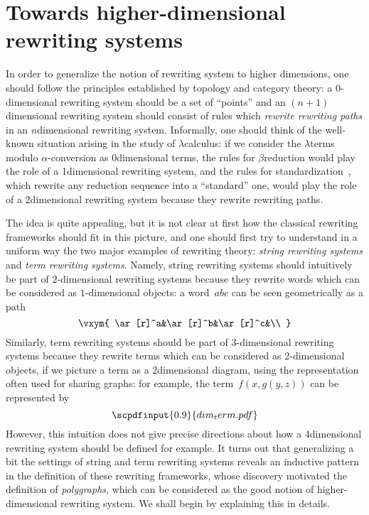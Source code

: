 \documentclass{LMCS}
\newcommand{\strid}[1]{\scpdfinput{0.9}{#1.pdf}}
\begin{document}
\section{Towards higher-dimensional rewriting systems}
\label{sec:hdrs}
In order to generalize the notion of rewriting system to higher dimensions, one
should follow the principles established by topology and category theory: a
$0$-dimensional rewriting system should be a set of ``points'' and an
$(n+1)$\nbd{}dimensional rewriting system should consist of rules which
\emph{rewrite rewriting paths} in an $n$\nbd{}dimensional rewriting
system. Informally, one should think of the well-known situation arising in the
study of $\lambda$\nbd{}calculus: if we consider the $\lambda$\nbd{}terms modulo
$\alpha$-conversion as $0$\nbd{}dimensional terms, the rules for
$\beta$\nbd{}reduction would play the role of a 1\nbd{}dimensional rewriting
system, and the rules for standardization~\cite{mellies:ast}, which rewrite any
reduction sequence into a ``standard'' one, would play the role of a 2\nbd{}dimensional
rewriting system because they rewrite rewriting paths.

The idea is quite appealing, but it is not clear at first how the classical
rewriting frameworks should fit in this picture, and one should first try to
understand in a uniform way the two major examples of rewriting theory:
\emph{string rewriting systems} and \emph{term rewriting systems}. Namely,
string rewriting systems should intuitively be part of $2$-dimensional rewriting
systems because they rewrite words which can be considered as $1$-dimensional
objects: a word~$abc$ can be seen geometrically as a path
\[
\vxym{
  \ar[r]^a&\ar[r]^b&\ar[r]^c&\\
}
\]
Similarly, term rewriting systems should be part of $3$-dimensional rewriting
systems because they rewrite terms which can be considered as $2$-dimensional
objects, if we picture a term as a $2$\nbd{}dimensional diagram, using the
representation often used for sharing graphs: for example, the
term~$f(x,g(y,z))$ can be represented by
\[
\strid{dim_term}
\]
However, this intuition does not give precise directions about how a
4\nbd{}dimensional rewriting system should be defined for example. It turns out
that generalizing a bit the settings of string and term rewriting systems
reveals an inductive pattern in the definition of these rewriting frameworks,
whose discovery motivated the definition of \emph{polygraphs}, which can be
considered as the good notion of higher-dimensional rewriting system. We shall
begin by explaining this in details.
\end{document}
